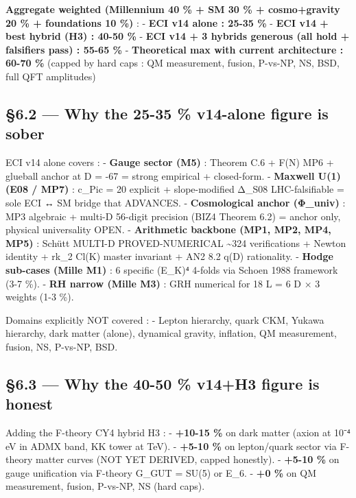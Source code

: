 \documentclass[
  11pt,
  a4paper,
]{article}
\begin{document}
\textbf{Aggregate weighted (Millennium 40 \% + SM 30 \% + cosmo+gravity 20 \% + foundations 10 \%)} :
- \textbf{ECI v14 alone : 25-35 \%}
- \textbf{ECI v14 + best hybrid (H3) : 40-50 \%}
- \textbf{ECI v14 + 3 hybrids generous (all hold + falsifiers pass) : 55-65 \%}
- \textbf{Theoretical max with current architecture : 60-70 \%} (capped by hard caps : QM measurement, fusion, P-vs-NP, NS, BSD, full QFT amplitudes)

\hypertarget{why-the-25-35-v14-alone-figure-is-sober}{%
\subsection{§6.2 --- Why the 25-35 \% v14-alone figure is sober}\label{why-the-25-35-v14-alone-figure-is-sober}}

ECI v14 alone covers :
- \textbf{Gauge sector (M5)} : Theorem C.6 + F(N) MP6 + glueball anchor at D = -67 = strong empirical + closed-form.
- \textbf{Maxwell U(1) (E08 / MP7)} : c\_Pic = 20 explicit + slope-modified Δ\_S08 LHC-falsifiable = sole ECI ↔ SM bridge that ADVANCES.
- \textbf{Cosmological anchor (Φ\_univ)} : MP3 algebraic + multi-D 56-digit precision (BIZ4 Theorem 6.2) = anchor only, physical universality OPEN.
- \textbf{Arithmetic backbone (MP1, MP2, MP4, MP5)} : Schütt MULTI-D PROVED-NUMERICAL \textasciitilde324 verifications + Newton identity + rk\_2 Cl(K) master invariant + AN2 8.2 q(D) rationality.
- \textbf{Hodge sub-cases (Mille M1)} : 6 specific (E\_K)⁴ 4-folds via Schoen 1988 framework (3-7 \%).
- \textbf{RH narrow (Mille M3)} : GRH numerical for 18 L = 6 D × 3 weights (1-3 \%).

Domains explicitly NOT covered :
- Lepton hierarchy, quark CKM, Yukawa hierarchy, dark matter (alone), dynamical gravity, inflation, QM measurement, fusion, NS, P-vs-NP, BSD.

\hypertarget{why-the-40-50-v14h3-figure-is-honest}{%
\subsection{§6.3 --- Why the 40-50 \% v14+H3 figure is honest}\label{why-the-40-50-v14h3-figure-is-honest}}

Adding the F-theory CY4 hybrid H3 :
- \textbf{+10-15 \%} on dark matter (axion at 10⁻⁴ eV in ADMX band, KK tower at TeV).
- \textbf{+5-10 \%} on lepton/quark sector via F-theory matter curves (NOT YET DERIVED, capped honestly).
- \textbf{+5-10 \%} on gauge unification via F-theory G\_GUT = SU(5) or E\_6.
- \textbf{+0 \%} on QM measurement, fusion, P-vs-NP, NS (hard caps).
\end{document}
